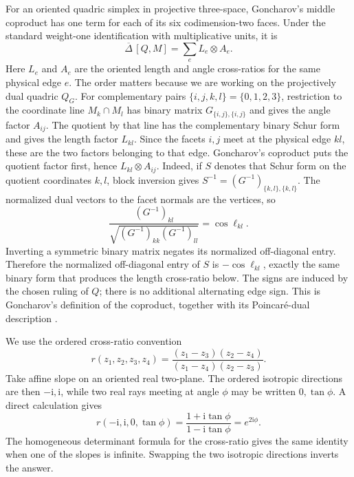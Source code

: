 For an oriented quadric simplex in projective three-space, Goncharov's
middle coproduct has one term for each of its six codimension-two faces.
Under the standard weight-one identification with multiplicative units, it
is
\begin{equation}
 \overline\Delta\,[Q,M]
   =\sum_e L_e\otimes A_e.
 \label{cp:eq-angle-length-coproduct}
\end{equation}
Here \(L_e\) and \(A_e\) are the oriented length and angle cross-ratios for
the same physical edge \(e\).  The order matters because we are working on
the projectively dual quadric \(Q_G\).  For complementary pairs
\(\{i,j,k,l\}=\{0,1,2,3\}\), restriction to the coordinate line
\(M_k\cap M_l\) has binary matrix
\(G_{\{i,j\},\{i,j\}}\) and gives the angle factor
\(A_{ij}\).  The quotient by that line has the complementary binary Schur
form and gives the length factor \(L_{kl}\).  Since the facets \(i,j\) meet
at the physical edge \(kl\), these are the two factors belonging to that
edge.  Goncharov's coproduct puts the quotient factor first, hence
\(L_{kl}\otimes A_{ij}\).
Indeed, if \(S\) denotes that Schur form on the quotient coordinates
\(k,l\), block inversion gives
\(S^{-1}=(G^{-1})_{\{k,l\},\{k,l\}}\).  The normalized dual vectors to
the facet normals are the vertices, so
\[
 \frac{(G^{-1})_{kl}}
      {\sqrt{(G^{-1})_{kk}(G^{-1})_{ll}}}=\cos\ell_{kl}.
\]
Inverting a symmetric binary matrix negates its normalized off-diagonal
entry.  Therefore the normalized off-diagonal entry of \(S\) is
\(-\cos\ell_{kl}\), exactly the same binary form that produces the length
cross-ratio below.
The signs are induced by the chosen ruling of \(Q\); there is no additional
alternating edge sign.  This is Goncharov's definition of the coproduct,
together with its Poincar\'{e}-dual description
\cite[the \(S_2(\C)\) cross-ratio example, the coproduct definition preceding
Theorem~4.5, and Proposition~4.9]{Goncharov1999}.

We use the ordered cross-ratio convention
\[
 r(z_1,z_2,z_3,z_4)
 =\frac{(z_1-z_3)(z_2-z_4)}
        {(z_1-z_4)(z_2-z_3)}.
\]
Take affine slope on an oriented real two-plane.  The ordered isotropic
directions are then \(-\mathrm i,\mathrm i\), while two real rays meeting
at angle \(\phi\) may be written \(0,\tan\phi\).  A direct calculation gives
\[
 r(-\mathrm i,\mathrm i,0,\tan\phi)
   =\frac{1+\mathrm i\tan\phi}{1-\mathrm i\tan\phi}
   =e^{2\mathrm i\phi}.
\]
The homogeneous determinant formula for the cross-ratio gives the same
identity when one of the slopes is infinite.  Swapping the two isotropic
directions inverts the answer.

